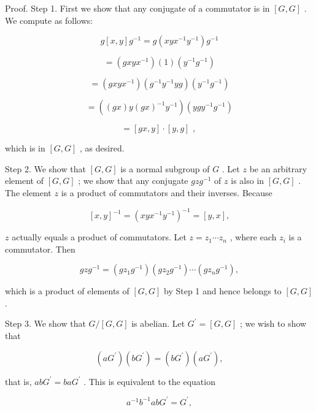 \documentclass[10pt]{article}
\begin{document}
Proof. Step 1. First we show that any conjugate of a commutator is in \(\left\lbrack  {G,G}\right\rbrack\) . We compute as follows:

\[
g\left\lbrack  {x,y}\right\rbrack  {g}^{-1} = g\left( {{xy}{x}^{-1}{y}^{-1}}\right) {g}^{-1}
\]

\[
= \left( {{gxy}{x}^{-1}}\right) \left( 1\right) \left( {{y}^{-1}{g}^{-1}}\right)
\]

\[
= \left( {{gxy}{x}^{-1}}\right) \left( {{g}^{-1}{y}^{-1}{yg}}\right) \left( {{y}^{-1}{g}^{-1}}\right)
\]

\[
= \left( {\left( {gx}\right) y{\left( gx\right) }^{-1}{y}^{-1}}\right) \left( {{yg}{y}^{-1}{g}^{-1}}\right)
\]

\[
= \left\lbrack  {{gx},y}\right\rbrack   \cdot  \left\lbrack  {y,g}\right\rbrack  \text{ , }
\]

which is in \(\left\lbrack  {G,G}\right\rbrack\) , as desired.

Step 2. We show that \(\left\lbrack  {G,G}\right\rbrack\) is a normal subgroup of \(G\) . Let \(z\) be an arbitrary element of \(\left\lbrack  {G,G}\right\rbrack\) ; we show that any conjugate \({gz}{g}^{-1}\) of \(z\) is also in \(\left\lbrack  {G,G}\right\rbrack\) . The element \(z\) is a product of commutators and their inverses. Because

\[
{\left\lbrack  x,y\right\rbrack  }^{-1} = {\left( xy{x}^{-1}{y}^{-1}\right) }^{-1} = \left\lbrack  {y,x}\right\rbrack  ,
\]

\(z\) actually equals a product of commutators. Let \(z = {z}_{1}\cdots {z}_{n}\) , where each \({z}_{i}\) is a commutator. Then

\[
{gz}{g}^{-1} = \left( {g{z}_{1}{g}^{-1}}\right) \left( {g{z}_{2}{g}^{-1}}\right) \cdots \left( {g{z}_{n}{g}^{-1}}\right) ,
\]

which is a product of elements of \(\left\lbrack  {G,G}\right\rbrack\) by Step 1 and hence belongs to \(\left\lbrack  {G,G}\right\rbrack\) .

Step 3. We show that \(G/\left\lbrack  {G,G}\right\rbrack\) is abelian. Let \({G}^{\prime } = \left\lbrack  {G,G}\right\rbrack\) ; we wish to show that

\[
\left( {a{G}^{\prime }}\right) \left( {b{G}^{\prime }}\right)  = \left( {b{G}^{\prime }}\right) \left( {a{G}^{\prime }}\right) ,
\]

that is, \({ab}{G}^{\prime } = {ba}{G}^{\prime }\) . This is equivalent to the equation

\[
{a}^{-1}{b}^{-1}{ab}{G}^{\prime } = {G}^{\prime },
\]
\end{document}
